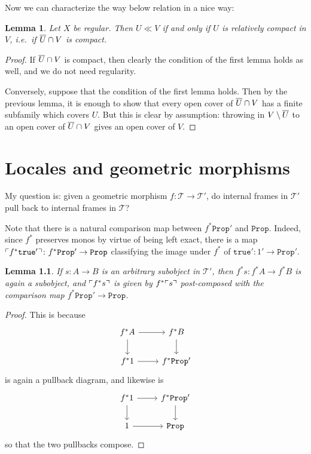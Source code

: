 \documentclass[11pt, oneside, article]{memoir}
\theoremstyle{plain}
\newtheorem{lemma}[theorem]{Lemma}
\theoremstyle{definition}
\theoremstyle{remark}
\DeclarePairedDelimiter{\classify}{\ulcorner}{\urcorner}
\newcommand{\const}[1]{\mathtt{#1}}
\newcommand{\Prop}{\const{Prop}}
\begin{document}
Now we can characterize the way below relation in a nice way:

\begin{lemma}
Let $X$ be regular. Then $U\ll V$ if and only if $U$ is relatively compact in $V$, i.e.~if $\overline{U}\cap V$ is compact.
\end{lemma}

\begin{proof}
If $\overline{U}\cap V$ is compact, then clearly the condition of the first lemma holds as well, and we do not need regularity.

Conversely, suppose that the condition of the first lemma holds. Then by the previous lemma, it is enough to show that every open cover of $\overline{U}\cap V$ has a finite subfamily which covers $U$. But this is clear by assumption: throwing in $V\setminus\overline{U}$ to an open cover of $\overline{U}\cap V$ gives an open cover of $V$.
\end{proof}

\chapter{Locales and geometric morphisms}

My question is: given a geometric morphism $f : \mathcal{T}\to\mathcal{T}'$, do internal frames in $\mathcal{T}'$ pull back to internal frames in $\mathcal{T}$?

Note that there is a natural comparison map between $f^*\Prop'$ and $\Prop$. Indeed, since $f^*$ preserves monos by virtue of being left exact, there is a map $\classify{f^*\const{true}'}\colon f^*\Prop'\to\Prop$ classifying the image under $f^*$ of $\const{true}'\colon 1'\to \Prop'$.

\begin{lemma}
If $s:A\to B$ is an arbitrary subobject in $\mathcal{T}'$, then $f^*s : f^*A\to f^*B$ is again a subobject, and $\classify{f^*s}$ is given by $f^*\classify{s}$ post-composed with the comparison map $f^*\Prop'\to\Prop$.
\end{lemma}

\begin{proof}
 This is because
\[\begin{tikzcd}
	f^*A \ar{r} \ar{d} & f^*B \ar{d} \\
	f^*1 \ar{r} & f^*\Prop'
\end{tikzcd}\]
is again a pullback diagram, and likewise is
\[\begin{tikzcd}
	f^*1 \ar{r} \ar{d} & f^*\Prop' \ar{d} \\
	1 \ar{r} & \Prop
\end{tikzcd}\]
so that the two pullbacks compose.
\end{proof}
\end{document}
